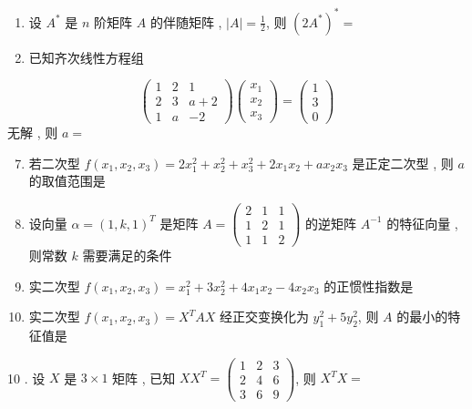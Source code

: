 \documentclass[10pt]{article}
\begin{document}
{\begin{enumerate}
  \item  设  $A^{*}$  是  $n$  阶矩阵  $A$  的伴随矩阵 , $|A|=\frac{1}{2}$,  则  $\left(2 A^{*}\right)^{*}=$

  \item  已知齐次线性方程组 

\end{enumerate}
$$
\left(\begin{array}{ccc}
1 & 2 & 1 \\
2 & 3 & a+2 \\
1 & a & -2
\end{array}\right)\left(\begin{array}{l}
x_{1} \\
x_{2} \\
x_{3}
\end{array}\right)=\left(\begin{array}{l}
1 \\
3 \\
0
\end{array}\right)
$$
 无解 ,  则  $a=$

\begin{enumerate}
  \setcounter{enumi}{6}
  \item  若二次型  $f\left(x_{1}, x_{2}, x_{3}\right)=2 x_{1}^{2}+x_{2}^{2}+x_{3}^{2}+2 x_{1} x_{2}+a x_{2} x_{3}$  是正定二次型 ,  则  $a$  的取值范围是 

  \item  设向量  $\alpha=(1, k, 1)^{T}$  是矩阵  $A=\left(\begin{array}{lll}2 & 1 & 1 \\ 1 & 2 & 1 \\ 1 & 1 & 2\end{array}\right)$  的逆矩阵  $A^{-1}$  的特征向量 ,  则常数  $k$  需要满足的条件 

  \item  实二次型  $f\left(x_{1}, x_{2}, x_{3}\right)=x_{1}^{2}+3 x_{2}^{2}+4 x_{1} x_{2}-4 x_{2} x_{3}$  的正惯性指数是 

  \item  实二次型  $f\left(x_{1}, x_{2}, x_{3}\right)=X^{T} A X$  经正交变换化为  $y_{1}^{2}+5 y_{2}^{2}$,  则  $A$  的最小的特征值是 

\end{enumerate}
10 .  设  $X$  是  $3 \times 1$  矩阵 ,  已知  $X X^{T}=\left(\begin{array}{lll}1 & 2 & 3 \\ 2 & 4 & 6 \\ 3 & 6 & 9\end{array}\right)$,  则  $X^{T} X=$

}
\end{document}
